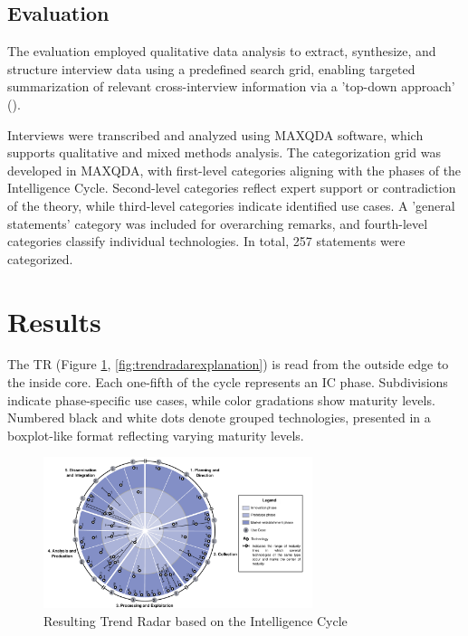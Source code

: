 \documentclass[10pt]{article}
\begin{document}
\subsection{Evaluation} \label{sec:eval}

The evaluation employed qualitative data analysis to extract, synthesize, and structure interview data using a predefined search grid, enabling targeted summarization of relevant cross-interview information via a 'top-down approach' (\cite{Bogner.2014}).

Interviews were transcribed and analyzed using MAXQDA software, which supports qualitative and mixed methods analysis. The categorization grid was developed in MAXQDA, with first-level categories aligning with the phases of the Intelligence Cycle. Second-level categories reflect expert support or contradiction of the theory, while third-level categories indicate identified use cases. A 'general statements' category was included for overarching remarks, and fourth-level categories classify individual technologies. In total, 257 statements were categorized.

\section{Results} \label{sec:results}

The TR (Figure \ref{fig:trendradar}, \ref{fig:trendradarexplanation}) is read from the outside edge to the inside core.
Each one-fifth of the cycle represents an IC phase. Subdivisions indicate
phase-specific use cases, while color gradations show maturity levels. Numbered black
and white dots denote grouped technologies, presented in a boxplot-like format reflecting
varying maturity levels.

\begin{figure}[thb]
    \centering
    \includegraphics[width=0.7\textwidth]{PDF/images/crop_Trendradar}
    \caption{Resulting Trend Radar based on the Intelligence Cycle}
    \label{fig:trendradar}
\end{figure}
\end{document}
